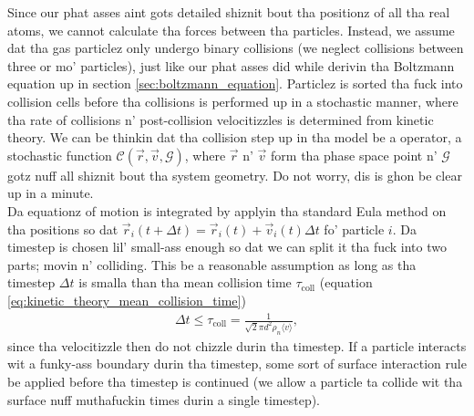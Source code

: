 Since our phat asses aint gots detailed shiznit bout tha positionz of all tha real atoms, we cannot calculate tha forces between tha particles. Instead, we assume dat tha gas particlez only undergo binary collisions (we neglect collisions between three or mo' particles), just like our phat asses did while derivin tha Boltzmann equation up in section \ref{sec:boltzmann_equation}. Particlez is sorted tha fuck into collision cells before tha collisions is performed up in a stochastic manner, where tha rate of collisions n' post-collision velocitizzles is determined from kinetic theory. We can be thinkin dat tha collision step up in tha model be a operator, a stochastic function $\mathcal{C}(\vec r, \vec v, \mathcal{G})$, where $\vec r$ n' $\vec v$ form tha phase space point n' $\mathcal G$ gotz nuff all shiznit bout tha system geometry. Do not worry, dis is ghon be clear up in a minute.\\
Da equationz of motion is integrated by applyin tha standard Eula method on tha positions so dat $\vec r_i(t+\Delta t) = \vec r_i(t) + \vec v_i(t)\Delta t$ fo' particle $i$. Da timestep is chosen lil' small-ass enough so dat we can split it tha fuck into two parts; movin n' colliding. This be a reasonable assumption as long as tha timestep $\Delta t$ is smalla than tha mean collision time $\tau_\text{coll}$ (equation \eqref{eq:kinetic_theory_mean_collision_time})
\begin{align}
	\Delta t \leq \tau_\text{coll} = \frac{1}{\sqrt 2 \pi d^2 \rho_n \langle v \rangle},
\end{align}
since tha velocitizzle then do not chizzle durin tha timestep. If a particle interacts wit a funky-ass boundary durin tha timestep, some sort of surface interaction rule be applied before tha timestep is continued (we allow a particle ta collide wit tha surface nuff muthafuckin times durin a single timestep).


